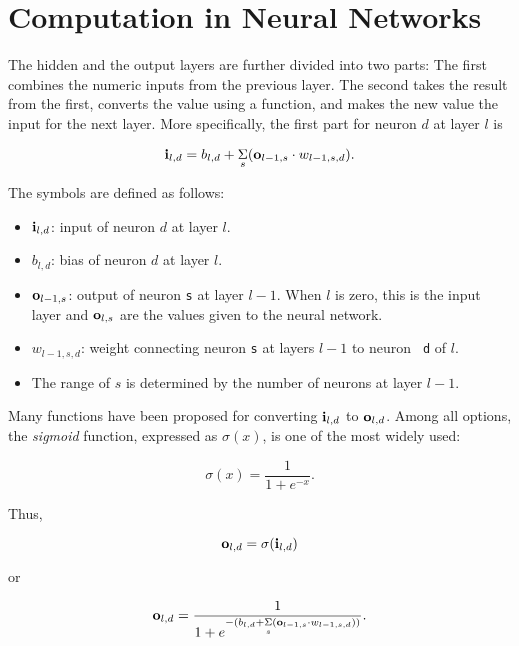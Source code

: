 \section{Computation in Neural Networks}

The hidden and the output layers are further divided into two parts:
The first combines the numeric inputs from the previous layer. The
second takes the result from the first, converts the value using a
function, and makes the new value the input for the next layer.  More
specifically, the first part for neuron $d$ at layer $l$ is

\begin{equation}
\mathscr {\bf i}_{l, d} = 
b_{l, d} + \underset{s} {\Sigma}
(\mathscr {\bf o}_{l-1, s}
\cdot
w_{l-1, s, d}).
\end{equation}

The symbols are defined as follows:
\begin{itemize}[noitemsep,nolistsep]
\item $\mathscr {\bf i}_{l, d}$:  input of neuron $d$ at layer $l$.
\item $b_{l,d}$:  bias of neuron $d$ at layer $l$.
\item $\mathscr {\bf o}_{l-1, s}$: output of neuron {\tt s} at layer $l-1$.
When $l$ is zero, this is the input layer and $\mathscr {\bf o}_{l,
s}$ are the values given to the neural network.
\item $w_{l-1, s, d}$:  weight connecting neuron {\tt s} at layers $l-1$ to neuron {\tt
d} of $l$.
\item The range of $s$ is determined by the number of neurons at layer $l-1$.
\end{itemize}

Many functions have been proposed for converting $\mathscr {\bf i}_{l,
d}$ to $\mathscr {\bf o}_{l, d}$.  Among all options, the {\it
sigmoid} function,  expressed as $\sigma(x)$, is one of the most widely
used:

\begin{equation}
\sigma(x) = \frac{1}{1 + e^{-x}}.
\end{equation}

Thus,

\begin{equation}
\mathscr {\bf o}_{l, d}
= \sigma(\mathscr {\bf i}_{l,d})
\end{equation}

or

\begin{equation}
\mathscr {\bf o}_{l, d} = 
\frac{1}
{
  1 + e^
  {
    -(
        b_{l, d} + \underset{s} {\Sigma}
        (
           \mathscr {\bf o}_{l-1, s}
           \cdot
          w_{l-1, s, d}
        )
      )
  }
}.
\end{equation}

